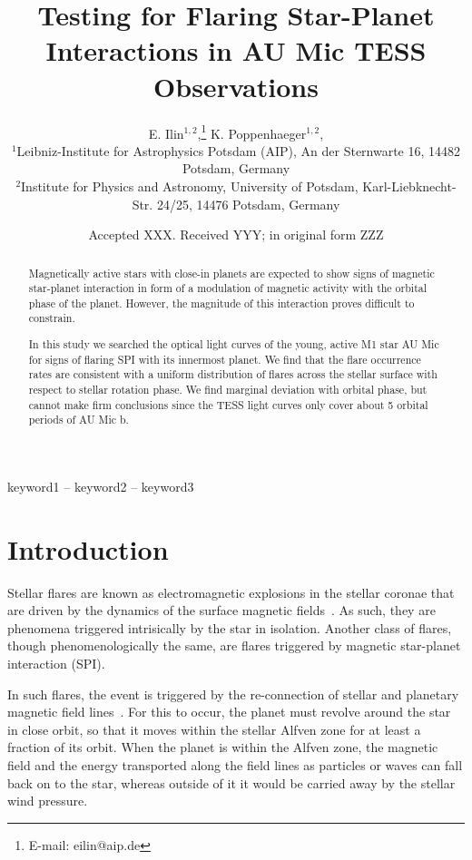 \documentclass[fleqn,usenatbib,letters]{mnras}%
\title[]{Testing for Flaring Star-Planet Interactions in AU Mic TESS Observations}
\author[E. Ilin et al.]{
E. Ilin$^{1,2}$,\thanks{E-mail: eilin@aip.de}
K. Poppenhaeger$^{1,2}$,
\\
$^{1}$Leibniz-Institute for Astrophysics Potsdam (AIP), An der Sternwarte 16, 14482 Potsdam, Germany\\
$^{2}$Institute for Physics and Astronomy, University of Potsdam, Karl-Liebknecht-Str. 24/25, 14476 Potsdam, Germany
}
\date{Accepted XXX. Received YYY; in original form ZZZ}
\begin{document}
\label{firstpage}
\pagerange{\pageref{firstpage}--\pageref{lastpage}}
\maketitle

\begin{abstract}
Magnetically active stars with close-in planets are expected to show signs of magnetic star-planet interaction in form of a modulation of magnetic activity with the orbital phase of the planet. However, the magnitude of this interaction proves difficult to constrain.

In this study we searched the optical light curves of the young, active M1 star AU Mic for signs of flaring SPI with its innermost planet. We find that the flare occurrence rates are consistent with a uniform distribution of flares across the stellar surface with respect to stellar rotation phase. We find marginal deviation with orbital phase, but cannot make firm conclusions since the TESS light curves only cover about 5 orbital periods of AU Mic b. 
\end{abstract}

\begin{keywords}
keyword1 -- keyword2 -- keyword3
\end{keywords}

%

\section{Introduction}

Stellar flares are known as electromagnetic explosions in the stellar coronae that are driven by the dynamics of the surface magnetic fields~\citep{benz2010}. As such, they are phenomena triggered intrisically by the star in isolation. Another class of flares, though phenomenologically the same, are flares triggered by magnetic star-planet interaction (SPI).

In such flares, the event is triggered by the re-connection of stellar and planetary magnetic field lines~\citep{lanza2018,fischer2019}. For this to occur, the planet must revolve around the star in close orbit, so that it moves within the stellar Alfven zone for at least a fraction of its orbit. When the planet is within the Alfven zone, the magnetic field and the energy transported along the field lines as particles or waves can fall back on to the star, whereas outside of it it would be carried away by the stellar wind pressure. 
\end{document}
